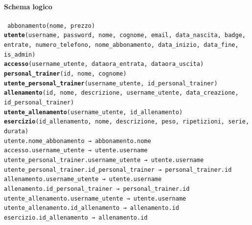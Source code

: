 \documentclass[a4paper]{article}
\begin{document}
	\paragraph{Schema logico}
	\texttt{
		abbonamento(nome, prezzo)\\
		{\bf utente}(username, password, nome, cognome, email, data\_nascita, badge, entrate, numero\_telefono, nome\_abbonamento, data\_inizio, data\_fine, is\_admin)\\
		{\bf accesso}(username\_utente, dataora\_entrata, dataora\_uscita)\\
		{\bf personal\_trainer}(id, nome, cognome)\\
		{\bf utente\_personal\_trainer}(username\_utente, id\_personal\_trainer)\\
		{\bf allenamento}(id, nome, descrizione, username\_utente, data\_creazione, id\_personal\_trainer)\\
		{\bf utente\_allenamento}(username\_utente, id\_allenamento)\\
		{\bf esercizio}(id\_allenamento, nome, descrizione, peso, ripetizioni, serie, durata)\\
		utente.nome\_abbonamento → abbonamento.nome\\
		accesso.username\_utente → utente.username\\
		utente\_personal\_trainer.username\_utente → utente.username\\
		utente\_personal\_trainer.id\_personal\_trainer → personal\_trainer.id\\
		allenamento.username\_utente → utente.username\\
		allenamento.id\_personal\_trainer → personal\_trainer.id\\
		utente\_allenamento.username\_utente → utente.username\\
		utente\_allenamento.id\_allenamento → allenamento.id\\
		esercizio.id\_allenamento → allenamento.id
}
\end{document}
